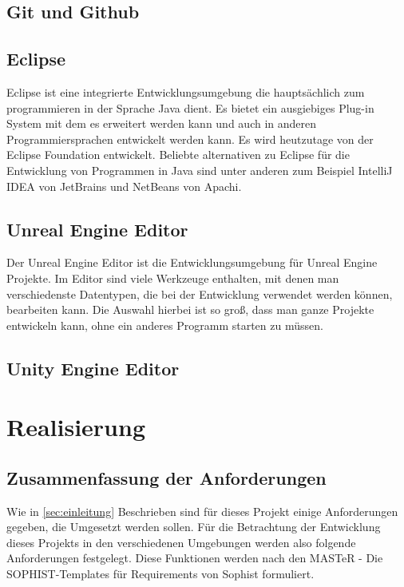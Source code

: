 \documentclass[
	12pt, %
	a4paper,
	listof=totoc, %
	bibliography=totoc, %
	numbers=noenddot, %
	ngerman, %
	headsepline, %
	oneside %
	]{scrbook} %
\begin{document}
\section{Git und Github}
\section{Eclipse}
Eclipse ist eine integrierte Entwicklungsumgebung die hauptsächlich zum programmieren in der Sprache Java dient. Es bietet ein ausgiebiges Plug-in System mit dem es erweitert werden kann und auch in anderen Programmiersprachen entwickelt werden kann.
Es wird heutzutage von der Eclipse Foundation entwickelt. Beliebte alternativen zu Eclipse für die Entwicklung von Programmen in Java sind unter anderen zum Beispiel IntelliJ IDEA von JetBrains und NetBeans von Apachi.

\section{Unreal Engine Editor}

Der Unreal Engine Editor ist die Entwicklungsumgebung für Unreal Engine Projekte. Im Editor sind viele Werkzeuge enthalten, mit denen man verschiedenste Datentypen, die bei der Entwicklung verwendet werden können, bearbeiten kann. 
Die Auswahl hierbei ist so groß, dass man ganze Projekte entwickeln kann, ohne ein anderes Programm starten zu müssen.


\section{Unity Engine Editor}



\chapter{Realisierung}\label{sec:Realisierung}
\section{Zusammenfassung der Anforderungen}
Wie in \ref{sec:einleitung} Beschrieben sind für dieses Projekt einige Anforderungen gegeben, die Umgesetzt werden sollen. Für die Betrachtung der Entwicklung dieses Projekts in den verschiedenen Umgebungen werden also folgende Anforderungen festgelegt.
Diese Funktionen werden nach den \glqq MASTeR - Die SOPHIST-Templates für Requirements\grqq{} von Sophist formuliert\cite{sophist}.
\end{document}
